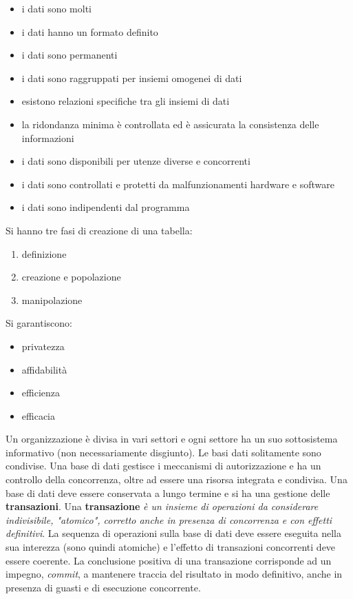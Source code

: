 \documentclass[a4paper,12pt, oneside]{book}
\begin{document}
\begin{itemize}
\item i dati sono molti
\item i dati hanno un formato definito
\item i dati sono permanenti
\item i dati sono raggruppati per insiemi omogenei di dati
\item esistono relazioni specifiche tra gli insiemi di dati
\item la ridondanza minima è controllata ed è assicurata la consistenza delle informazioni
\item i dati sono disponibili per utenze diverse  e concorrenti
\item i dati sono controllati e  protetti da
malfunzionamenti hardware e software
\item i dati sono indipendenti dal programma
\end{itemize}
Si hanno tre fasi di creazione di una tabella:
\begin{enumerate}
\item definizione
\item creazione e popolazione
\item manipolazione
\end{enumerate}
Si garantiscono:
\begin{itemize}
\item privatezza
\item affidabilità
\item efficienza
\item efficacia
\end{itemize}
Un organizzazione è divisa in vari settori e ogni settore ha un suo sottosistema informativo (non necessariamente disgiunto). Le basi dati solitamente sono condivise. Una base di dati gestisce i meccanismi di autorizzazione e ha un controllo della concorrenza, oltre ad essere una risorsa integrata e condivisa. Una base di dati deve essere conservata a lungo termine e si ha una gestione delle \textbf{transazioni}. Una \textbf{transazione} \textit{è un insieme di operazioni da considerare indivisibile, "atomico", corretto anche in presenza di concorrenza e con effetti definitivi}. La sequenza di operazioni sulla base di dati deve essere eseguita nella sua interezza (sono quindi atomiche) e l'effetto di transazioni concorrenti deve essere coerente. La conclusione positiva di una transazione corrisponde ad un impegno, \textit{commit}, a mantenere traccia del risultato in modo definitivo, anche in presenza di guasti e di esecuzione concorrente.\\
\end{document}
